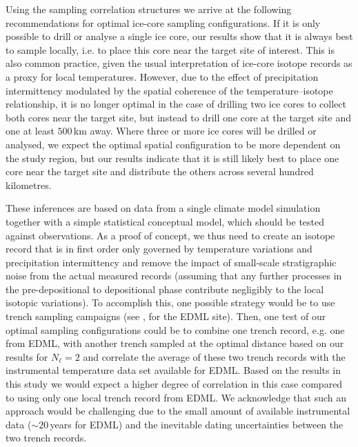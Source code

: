 \documentclass[cp]{copernicus}
\begin{document}
Using the sampling correlation structures we arrive at the following
recommendations for optimal ice-core sampling configurations. If it is only
possible to drill or analyse a single ice core, our results show that it is
always best to sample locally, i.e. to place this core near the target site of
interest. This is also common practice, given the usual interpretation of
ice-core isotope records as a proxy for local temperatures. However, due to the
effect of precipitation intermittency modulated by the spatial coherence of the
temperature--isotope relationship, it is no longer optimal in the case of
drilling two ice cores to collect both cores near the target site, but instead
to drill one core at the target site and one at least $500$\,km away. Where
three or more ice cores will be drilled or analysed, we expect the optimal
spatial configuration to be more dependent on the study region, but our results
indicate that it is still likely best to place one core near the target site and
distribute the others across several hundred kilometres.

These inferences are based on data from a single climate model simulation
together with a simple statistical conceptual model, which should be tested
against observations. As a proof of concept, we thus need to create an isotope
record that is in first order only governed by temperature variations and
precipitation intermittency and remove the impact of small-scale stratigraphic
noise from the actual measured records (assuming that any further processes in
the pre-depositional to depositional phase contribute negligibly to the local
isotopic variations). To accomplish this, one possible strategy would be to use
trench sampling campaigns (see \citealp{Munch2016,Munch2017}, for the EDML
site). Then, one test of our optimal sampling configurations could be to combine
one trench record, e.g. one from EDML, with another trench sampled at the
optimal distance based on our results for $N_{\ell}=2$ and correlate the average
of these two trench records with the instrumental temperature data set available
for EDML. Based on the results in this study we would expect a higher degree of
correlation in this case compared to using only one local trench record from
EDML. We acknowledge that such an approach would be challenging due to the small
amount of available instrumental data ($\sim20$\,years for EDML) and the
inevitable dating uncertainties between the two trench records.
\end{document}

